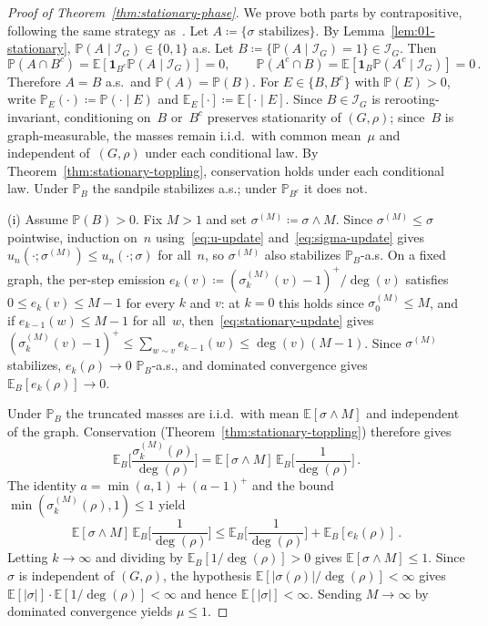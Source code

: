 \documentclass[aop]{imsart}
\theoremstyle{plain}
\theoremstyle{definition}
\newcommand{\E}{\mathbb{E}}
\renewcommand{\P}{\mathbb{P}}
\newcommand{\one}{\mathbf{1}}
\begin{document}
	\begin{proof}[Proof of Theorem~\ref{thm:stationary-phase}]
		We prove both parts by contrapositive, following the same strategy as~\citet[Lemmas~4.1 and~4.2]{div-sand-crit}. Let $A\coloneqq\{\sigma\text{ stabilizes}\}$. By Lemma~\ref{lem:01-stationary}, $\P(A\mid\mathcal{I}_G)\in\{0,1\}$ a.s. Let $B\coloneqq\{\P(A\mid\mathcal{I}_G)=1\}\in\mathcal{I}_G$. Then
		\[
		\P(A\cap B^c)=\E[\one_{B^c}\P(A\mid\mathcal{I}_G)]=0,\qquad \P(A^c\cap B)=\E[\one_B\P(A^c\mid\mathcal{I}_G)]=0\,.
		\]
		Therefore $A=B$ a.s.\ and $\P(A)=\P(B)$. For $E\in\{B,B^c\}$ with $\P(E)>0$, write $\P_E(\cdot)\coloneqq\P(\cdot\mid E)$ and $\E_E[\cdot]\coloneqq\E[\cdot\mid E]$. Since $B\in\mathcal{I}_G$ is rerooting-invariant, conditioning on~$B$ or~$B^c$ preserves stationarity of $(G,\rho)$; since~$B$ is graph-measurable, the masses remain i.i.d.\ with common mean~$\mu$ and independent of~$(G,\rho)$ under each conditional law. By Theorem~\ref{thm:stationary-toppling}, conservation holds under each conditional law. Under $\P_B$ the sandpile stabilizes a.s.; under $\P_{B^c}$ it does not.
		
		\medskip
		\textup{(i)}\;
		Assume $\P(B)>0$. Fix $M>1$ and set $\sigma^{(M)}\coloneqq\sigma\wedge M$. Since $\sigma^{(M)}\leq\sigma$ pointwise, induction on~$n$ using~\eqref{eq:u-update} and~\eqref{eq:sigma-update} gives $u_n(\cdot;\sigma^{(M)})\leq u_n(\cdot;\sigma)$ for all~$n$, so $\sigma^{(M)}$ also stabilizes $\P_B$-a.s. On a fixed graph, the per-step emission $e_k(v)\coloneqq(\sigma_k^{(M)}(v)-1)^+/\deg(v)$ satisfies $0\leq e_k(v)\leq M-1$ for every $k$ and $v$: at $k=0$ this holds since $\sigma_0^{(M)}\leq M$, and if $e_{k-1}(w)\leq M-1$ for all~$w$, then~\eqref{eq:stationary-update} gives $(\sigma_k^{(M)}(v)-1)^+\leq\sum_{w\sim v}e_{k-1}(w)\leq\deg(v)(M-1)$. Since $\sigma^{(M)}$ stabilizes, $e_k(\rho)\to 0$ $\P_B$-a.s., and dominated convergence gives $\E_B[e_k(\rho)]\to 0$.
		
		Under $\P_B$ the truncated masses are i.i.d.\ with mean $\E[\sigma\wedge M]$ and independent of the graph. Conservation (Theorem~\ref{thm:stationary-toppling}) therefore gives
		\[
		\E_B\biggl[\frac{\sigma_k^{(M)}(\rho)}{\deg(\rho)}\biggr] = \E[\sigma\wedge M]\,\E_B\biggl[\frac{1}{\deg(\rho)}\biggr]\,.
		\]
		The identity $a=\min(a,1)+(a-1)^+$ and the bound $\min(\sigma_k^{(M)}(\rho),1)\leq 1$ yield
		\[
		\E[\sigma\wedge M]\,\E_B\biggl[\frac{1}{\deg(\rho)}\biggr] \leq \E_B\biggl[\frac{1}{\deg(\rho)}\biggr] + \E_B[e_k(\rho)]\,.
		\]
		Letting $k\to\infty$ and dividing by $\E_B[1/\deg(\rho)]>0$ gives $\E[\sigma\wedge M]\leq 1$. Since $\sigma$ is independent of $(G,\rho)$, the hypothesis $\E[|\sigma(\rho)|/\deg(\rho)]<\infty$ gives $\E[|\sigma|]\cdot\E[1/\deg(\rho)]<\infty$ and hence $\E[|\sigma|]<\infty$. Sending $M\to\infty$ by dominated convergence yields $\mu\leq 1$.
		

\end{proof}
\end{document}
